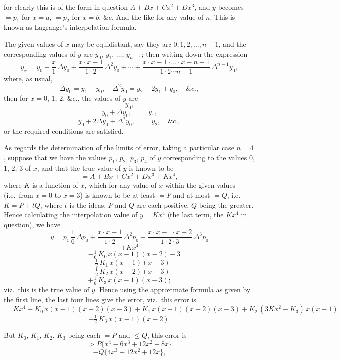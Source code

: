 \documentclass[11pt,a4paper]{book}
\begin{document}
\clearpage

\noindent
for clearly this is of the form in question $A + Bx + Cx^2 + Dx^3$, and $y$ becomes $= p_1$ for
$x = a$, $= p_2$ for $x = b$, \&c.  And the like for any value of $n$.  This is known as Lagrange's
interpolation formula.

The given values of $x$ may be equidistant, say they are $0, 1, 2, \ldots, n - 1$, and the
corresponding values of $y$ are $y_0$, $y_1$, $\ldots$, $y_{n-1}$; then writing down the expression
\[
y_x = y_0 + \frac{x}{1}\,\Delta y_0 + \frac{x \cdot x - 1}{1 \cdot 2}\,\Delta^2 y_0 + \cdots + \frac{x \cdot x - 1 \cdot \ldots \cdot x - n + 1}{1 \cdot 2 \cdots n - 1}\,\Delta^{n-1} y_0,
\]
where, as usual,
\[
\Delta y_0 = y_1 - y_0, \quad \Delta^2 y_0 = y_2 - 2y_1 + y_0, \quad \&c.,
\]
then for $x = 0$, $1$, $2$, \&c., the values of $y$ are
\[
y_0,
\]
\[
y_0 + \Delta y_0, \quad = y_1,
\]
\[
y_0 + 2\Delta y_0 + \Delta^2 y_0, \quad = y_2, \quad \&c.,
\]
or the required conditions are satisfied.

As regards the determination of the limits of error, taking a particular case $n = 4$,
suppose that we have the values $p_1$, $p_2$, $p_3$, $p_4$ of $y$ corresponding to the values
$0$, $1$, $2$, $3$ of $x$, and that the true value of $y$ is known to be
\[
= A + Bx + Cx^2 + Dx^3 + Kx^4,
\]
where $K$ is a function of $x$, which for any value of $x$ within the given values (i.e.\
from $x = 0$ to $x = 3$) is known to be at least $= P$ and at most $= Q$, i.e.\ $K = P + tQ$,
where $t$ is the ideas. $P$ and $Q$ are each positive. $Q$ being the greater. Hence
calculating the interpolation value of $y = Kx^4$ (the last term, the $Kx^4$ in question),
we have
\[
y = p_1\,\frac{1}{6}\,\Delta p_0 + \frac{x \cdot x - 1}{1 \cdot 2}\,\Delta^2 p_0 + \frac{x \cdot x - 1 \cdot x - 2}{1 \cdot 2 \cdot 3}\,\Delta^3 p_0
\]
\[
+ Kx^4
\]
\[
= - \tfrac{1}{6}\,K_0\,x(x-1)(x-2) - 3
\]
\[
+ \tfrac{1}{2}\,K_1\,x(x-1)(x-3)
\]
\[
- \tfrac{1}{2}\,K_2\,x(x-2)(x-3)
\]
\[
+ \tfrac{1}{6}\,K_3\,x(x-1)(x-3);
\]
viz.\ this is the true value of $y$. Hence using the approximate formula as given by
the first line, the last four lines give the error, viz.\ this error is
\[
= Kx^4 + K_0\,x(x-1)(x-2)(x-3) + K_1\,x(x-1)(x-2)(x-3) + K_2\,(3Kx^2 - K_3)\,x(x-1)
\]
\[
- \tfrac{1}{2}\,K_3\,x(x-1)(x-2).
\]

But $K_0$, $K_1$, $K_2$, $K_3$ being each $= P$ and $\leq Q$, this error is
\[
> P\{x^4 - 6x^3 + 12x^2 - 8x\}
\]
\[
- Q\{4x^3 - 12x^2 + 12x\},
\]

\clearpage
\end{document}
